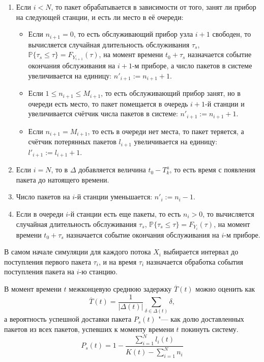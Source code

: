 \begin{enumerate}

\item{Если $i < N$, то пакет обрабатывается в зависимости от того, занят ли прибор на следующей станции, и есть ли место в её очереди:
\begin{itemize}
\item Если $n_{i+1} = 0$, то есть обслуживающий прибор узла $i+1$ свободен, то вычисляется случайная длительность обслуживания $\tau_s$, $\mathbb{P}\{\tau_s \leqslant \tau\} = F_{Y_{i+1}}(\tau)$, на момент времени $t_0 + \tau_s$ назначается событие окончания обслуживания на $i+1$-м приборе, а число пакетов в системе увеличивается на единицу: $n'_{i+1} := n_{i+1} + 1$.
\item Если $1 \leqslant n_{i+1} \leqslant M_{i+1}$, то есть обслуживающий прибор занят, но в очереди есть место, то пакет помещается в очередь $i+1$-й станции и увеличивается счётчик числа пакетов в системе: $n'_{i+1} := n_{i+1} + 1$.
\item Если $n_{i+1} = M_{i+1}$, то есть в очереди нет места, то пакет теряется, а счётчик потерянных пакетов $l_{i+1}$ увеличивается на единицу: $l'_{i+1} := l_{i+1} + 1$.
\end{itemize}
}

\item{Если $i = N$, то в $\Delta$ добавляется величина $t_0 - T_k^a$, то есть время с появления пакета до натоящего времени.}
\item{Число пакетов на $i$-й станции уменьшается: $n'_i := n_i - 1$.}
\item{Если в очереди $i$-й станции есть еще пакеты, то есть $n_i > 0$, то вычисляется случайная длительность обслуживания $\tau_s$, $\mathbb{P}\{\tau_s \leqslant \tau\} = F_{Y_i}(\tau)$, на момент времени $t_0 + \tau_s$ назначается событие окончания обслуживания на $i$-м приборе.}
\end{enumerate}

В самом начале симуляции для каждого потока $X_i$ выбирается интервал до поступления первого пакета $\tau_i$, и на время $\tau_i$ назначается обработка события поступления пакета на $i$-ю станцию.

В момент времени $t$ межконцевую среднюю задержку $\overline{T}(t)$ можно оценить как
$$
\overline{T}(t) = \frac{1}{|\Delta(t)|}\sum\limits_{\delta \in \Delta(t)} \delta,
$$
а вероятность успешной доставки пакета $P_s(t)$ "--- как долю доставленных пакетов из всех пакетов, успевших к моменту времени $t$ покинуть систему.
$$
P_s(t) = 1 - \frac{\sum\limits_{i=1}^{N} l_i(t)}{K(t) - \sum\limits_{i=1}^{N} n_i}
$$

